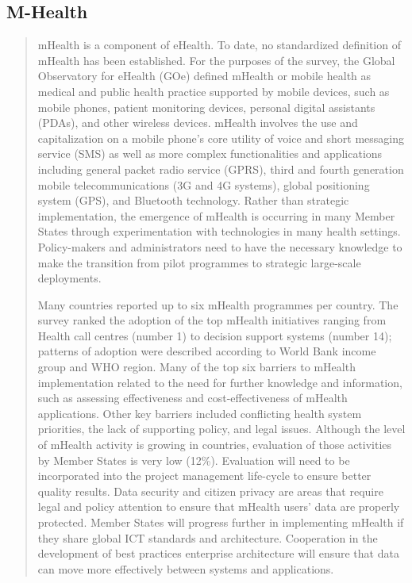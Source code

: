\subsection{M-Health}
\begin{quotation}
mHealth is a component of eHealth. To date, no standardized definition of mHealth has been established. 
For the purposes of the survey, the Global Observatory for eHealth (GOe) defined mHealth or mobile 
health as medical and public health practice supported by mobile devices, such as mobile phones, patient 
monitoring devices, personal digital assistants (PDAs), and other wireless devices. 
mHealth involves the use and capitalization on a mobile phone’s core utility of voice and short messaging 
service (SMS) as well as more complex functionalities and applications including general packet radio 
service (GPRS), third and fourth generation mobile telecommunications (3G and 4G systems), global 
positioning system (GPS), and Bluetooth technology.
 Rather than strategic implementation, the emergence of mHealth is occurring in many Member 
States through experimentation with technologies in many health settings. Policy-makers 
and administrators need to have the necessary knowledge to make the transition from pilot 
programmes to strategic large-scale deployments.



Many countries reported up to six mHealth programmes per country.
The survey ranked the adoption of the top mHealth initiatives ranging from Health call centres 
(number 1) to decision support systems (number 14); patterns of adoption were described 
according to World Bank income group and WHO region.
Many of the top six barriers to mHealth implementation related to the need for further 
knowledge and information, such as assessing effectiveness and cost-effectiveness of mHealth 
applications. Other key barriers included conflicting health system priorities, the lack of 
supporting policy, and legal issues.
Although the level of mHealth activity is growing in countries, evaluation of those activities 
by Member States is very low (12\%). Evaluation will need to be incorporated into the project 
management life-cycle to ensure better quality results.
Data security and citizen privacy are areas that require legal and policy attention to ensure that 
mHealth users’ data are properly protected.
Member States will progress further in implementing mHealth if they share global ICT standards 
and architecture. Cooperation in the development of best practices enterprise architecture will 
ensure that data can move more effectively between systems and applications.

\cite{mhealth:who}
\end{quotation}

